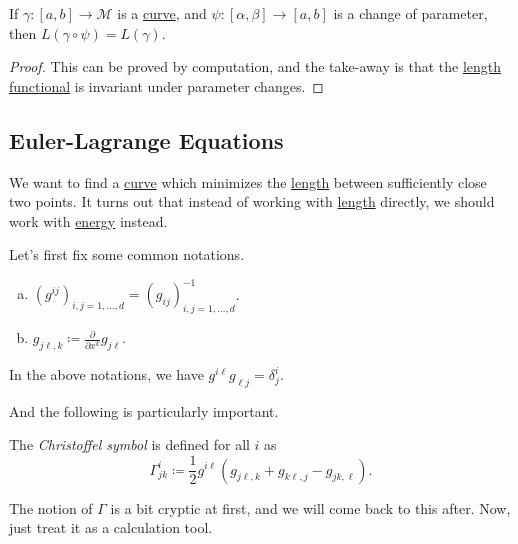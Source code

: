 \begin{lemma}
	If \(\gamma\colon [a, b] \to  \mathcal{M} \) is a \hyperref[def:curve]{curve}, and \(\psi \colon [\alpha , \beta ] \to  [a, b]\) is a change of parameter, then \(L(\gamma \circ \psi ) = L(\gamma )\).
\end{lemma}
\begin{proof}
	This can be proved by computation, and the take-away is that the \hyperref[def:length]{length functional} is invariant under parameter changes.
\end{proof}

\subsection{Euler-Lagrange Equations}
We want to find a \hyperref[def:curve]{curve} which minimizes the \hyperref[def:length]{length} between sufficiently close two points. It turns out that instead of working with \hyperref[def:length]{length} directly, we should work with \hyperref[def:energy]{energy} instead.

\begin{notation}
	Let's first fix some common notations.

	\begin{enumerate}[(a)]
		\item \(\left( g^{ij} \right) _{i, j=1, \ldots , d} = \left( g_{ij} \right)_{i, j = 1, \ldots , d} ^{-1} \).
		\item \(g_{j \ell , k} \coloneqq \frac{\partial }{\partial x^k} g_{j \ell }\).
	\end{enumerate}
\end{notation}

\begin{note}
	In the above notations, we have \(g^{i \ell} g_{\ell j}=\delta ^i_j \).
\end{note}

And the following is particularly important.

\begin{notation}\label{not:Christoffel-symbol}
	The \emph{Christoffel symbol} is defined for all \(i\) as
	\[
		\Gamma ^i_{jk} \coloneqq \frac{1}{2}g^{i \ell }\left( g_{j \ell , k} + g_{k \ell , j} - g_{jk, \ell }\right).
	\]
\end{notation}

\begin{remark}
	The notion of \(\Gamma \) is a bit cryptic at first, and we will come back to this after. Now, just treat it as a calculation tool.
\end{remark}

